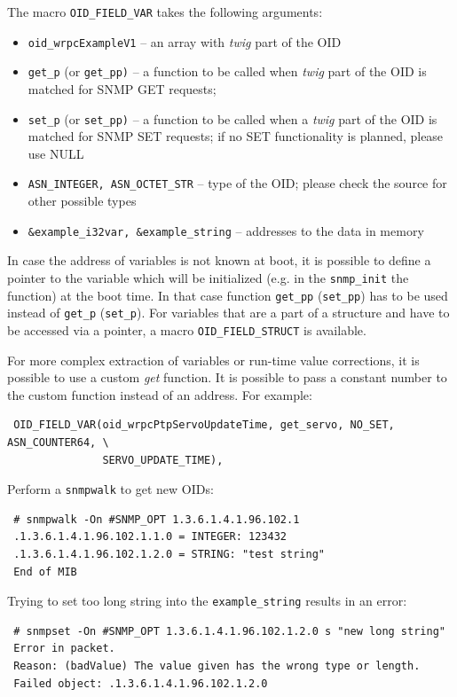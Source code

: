 \documentclass[a4paper, 12pt]{article}
\begin{document}
\begin{itemize}
The macro \texttt{OID\_FIELD\_VAR} takes the following arguments:
\begin{itemize}
   \item \texttt{oid\_wrpcExampleV1} -- an array with \textit{twig} part of the OID
   \item \texttt{get\_p} (or \texttt{get\_pp)} -- a function to be called when \textit{twig}
         part of the OID is matched for SNMP GET requests;
   \item \texttt{set\_p} (or \texttt{set\_pp)} -- a function to be called when a \textit{twig}
         part of the OID is matched for SNMP SET requests; if no SET
         functionality is planned, please use NULL
   \item \texttt{ASN\_INTEGER, ASN\_OCTET\_STR} -- type of the OID; please
         check the source for other possible types
   \item \texttt{\&example\_i32var, \&example\_string} -- addresses to the data in
         memory
\end{itemize}

In case the address of variables is not known at boot, it is possible to define
a pointer to the variable which will be initialized (e.g. in the \texttt{snmp\_init}
the function) at the boot time. In that case function \texttt{get\_pp} (\texttt{set\_pp}) has
to be used instead of \texttt{get\_p} (\texttt{set\_p}). For variables that are a part of
a structure and have to be accessed via a pointer, a macro \texttt{OID\_FIELD\_STRUCT}
is available.

For more complex extraction of variables or run-time value corrections,
it is possible to use a custom \textit{get} function. It is possible to pass
a constant number to the custom function instead of an address. For example:
\begin{lstlisting}
 OID_FIELD_VAR(oid_wrpcPtpServoUpdateTime, get_servo, NO_SET, ASN_COUNTER64, \
               SERVO_UPDATE_TIME),
\end{lstlisting}

\end{itemize}

Perform a \texttt{snmpwalk} to get new OIDs:
\begin{lstlisting}
 # snmpwalk -On #SNMP_OPT 1.3.6.1.4.1.96.102.1
 .1.3.6.1.4.1.96.102.1.1.0 = INTEGER: 123432
 .1.3.6.1.4.1.96.102.1.2.0 = STRING: "test string"
 End of MIB
\end{lstlisting}

Trying to set too long string into the \texttt{example\_string} results in an error:
\begin{lstlisting}
 # snmpset -On #SNMP_OPT 1.3.6.1.4.1.96.102.1.2.0 s "new long string"
 Error in packet.
 Reason: (badValue) The value given has the wrong type or length.
 Failed object: .1.3.6.1.4.1.96.102.1.2.0
\end{lstlisting}
\end{document}
